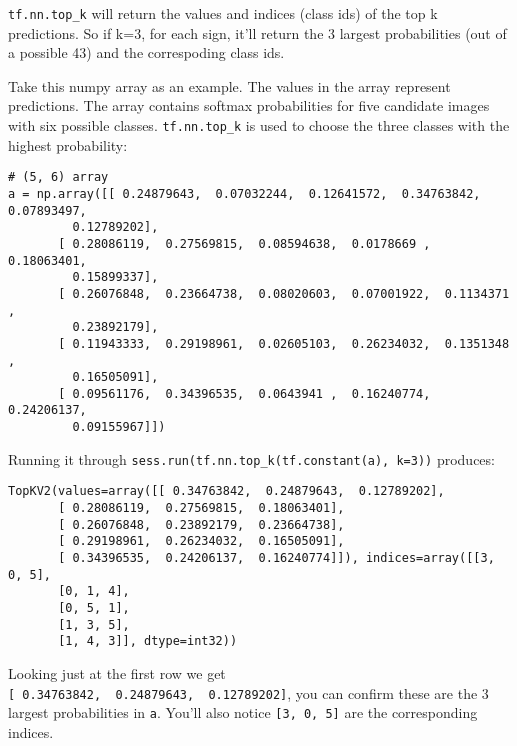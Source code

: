 \documentclass[11pt]{article}
\begin{document}
\texttt{tf.nn.top\_k} will return the values and indices (class ids) of
the top k predictions. So if k=3, for each sign, it'll return the 3
largest probabilities (out of a possible 43) and the correspoding class
ids.

Take this numpy array as an example. The values in the array represent
predictions. The array contains softmax probabilities for five candidate
images with six possible classes. \texttt{tf.nn.top\_k} is used to
choose the three classes with the highest probability:

\begin{verbatim}
# (5, 6) array
a = np.array([[ 0.24879643,  0.07032244,  0.12641572,  0.34763842,  0.07893497,
         0.12789202],
       [ 0.28086119,  0.27569815,  0.08594638,  0.0178669 ,  0.18063401,
         0.15899337],
       [ 0.26076848,  0.23664738,  0.08020603,  0.07001922,  0.1134371 ,
         0.23892179],
       [ 0.11943333,  0.29198961,  0.02605103,  0.26234032,  0.1351348 ,
         0.16505091],
       [ 0.09561176,  0.34396535,  0.0643941 ,  0.16240774,  0.24206137,
         0.09155967]])
\end{verbatim}

Running it through \texttt{sess.run(tf.nn.top\_k(tf.constant(a),\ k=3))}
produces:

\begin{verbatim}
TopKV2(values=array([[ 0.34763842,  0.24879643,  0.12789202],
       [ 0.28086119,  0.27569815,  0.18063401],
       [ 0.26076848,  0.23892179,  0.23664738],
       [ 0.29198961,  0.26234032,  0.16505091],
       [ 0.34396535,  0.24206137,  0.16240774]]), indices=array([[3, 0, 5],
       [0, 1, 4],
       [0, 5, 1],
       [1, 3, 5],
       [1, 4, 3]], dtype=int32))
\end{verbatim}

Looking just at the first row we get
\texttt{{[}\ 0.34763842,\ \ 0.24879643,\ \ 0.12789202{]}}, you can
confirm these are the 3 largest probabilities in \texttt{a}. You'll also
notice \texttt{{[}3,\ 0,\ 5{]}} are the corresponding indices.
\end{document}
